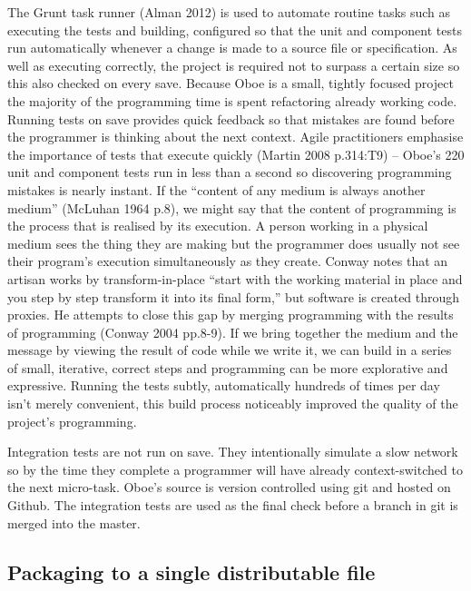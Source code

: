 \documentclass[12pt, ]{article}
\begin{document}
The Grunt task runner (Alman 2012) is used to automate routine tasks
such as executing the tests and building, configured so that the unit
and component tests run automatically whenever a change is made to a
source file or specification. As well as executing correctly, the
project is required not to surpass a certain size so this also checked
on every save. Because Oboe is a small, tightly focused project the
majority of the programming time is spent refactoring already working
code. Running tests on save provides quick feedback so that mistakes are
found before the programmer is thinking about the next context. Agile
practitioners emphasise the importance of tests that execute quickly
(Martin 2008 p.314:T9) -- Oboe's 220 unit and component tests run in
less than a second so discovering programming mistakes is nearly
instant. If the ``content of any medium is always another medium''
(McLuhan 1964 p.8), we might say that the content of programming is the
process that is realised by its execution. A person working in a
physical medium sees the thing they are making but the programmer does
usually not see their program's execution simultaneously as they create.
Conway notes that an artisan works by transform-in-place ``start with
the working material in place and you step by step transform it into its
final form,'' but software is created through proxies. He attempts to
close this gap by merging programming with the results of programming
(Conway 2004 pp.8-9). If we bring together the medium and the message by
viewing the result of code while we write it, we can build in a series
of small, iterative, correct steps and programming can be more
explorative and expressive. Running the tests subtly, automatically
hundreds of times per day isn't merely convenient, this build process
noticeably improved the quality of the project's programming.

Integration tests are not run on save. They intentionally simulate a
slow network so by the time they complete a programmer will have already
context-switched to the next micro-task. Oboe's source is version
controlled using git and hosted on Github. The integration tests are
used as the final check before a branch in git is merged into the
master.

\subsection{Packaging to a single distributable
file}\label{packaging-to-a-single-distributable-file}
\end{document}
